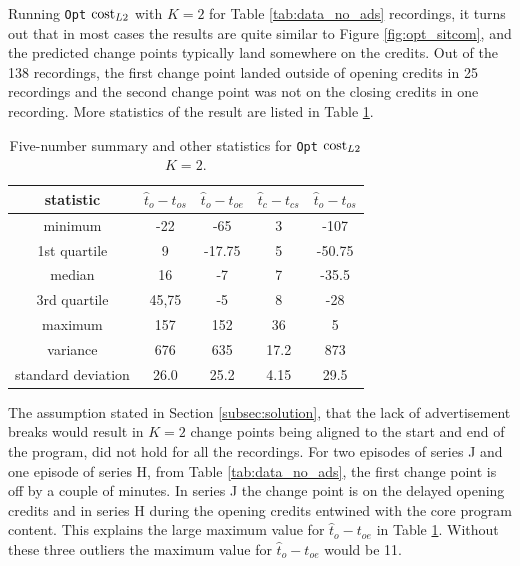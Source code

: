 Running \texttt{Opt} $\operatorname{cost}_{L2}$ with $K=2$ for Table \ref{tab:data_no_ads} recordings, it turns out that in most cases the results are quite similar to Figure \ref{fig:opt_sitcom}, and the predicted change points typically land somewhere on the credits. Out of the 138 recordings, the first change point landed outside of opening credits in 25 recordings
and the second change point was not on the closing credits in one recording. More statistics of the result are listed in Table \ref{tab:statistics_opt}.

\begin{table}[h]
  \begin{center}
  \begin{tabular}{|c|c|c|c|c|}
      \hline
      \textbf{statistic} & $\hat{t}_o-t_{os}$ & $\hat{t}_o-t_{oe}$ & $\hat{t}_c-t_{cs}$ & $\hat{t}_o-t_{os}$  \\ \hline
      minimum & -22 & -65 & 3 & -107\\ \hline
      1st quartile & 9 & -17.75 & 5 & -50.75\\ \hline
      median & 16 & -7 & 7 & -35.5\\ \hline
      3rd quartile & 45,75 & -5 & 8 & -28 \\ \hline
      maximum & 157 & 152	& 36 & 5\\ \hline
      variance & 676 & 635	& 17.2 & 873\\ \hline
      standard deviation & 26.0 & 25.2 & 4.15 & 29.5\\ \hline
  \end{tabular}
  \end{center}
  \caption{Five-number summary and other statistics for \texttt{Opt} $\operatorname{cost}_{L2}$ $K=2$.}
  \label{tab:statistics_opt}
\end{table}

The assumption stated in Section \ref{subsec:solution}, that the lack of advertisement breaks would result in $K=2$ change points being aligned to the start and end of the program, did not hold for all the recordings. For two episodes of series J and one episode of series H, from Table \ref{tab:data_no_ads}, the first change point is off by a couple of minutes. In series J the change point is on the delayed opening credits and in series H during the opening credits entwined with the core program content. This explains the large maximum value for $\hat{t}_o-t_{oe}$ in Table \ref{tab:statistics_opt}. Without these three outliers the maximum value for $\hat{t}_o-t_{oe}$ would be 11.

